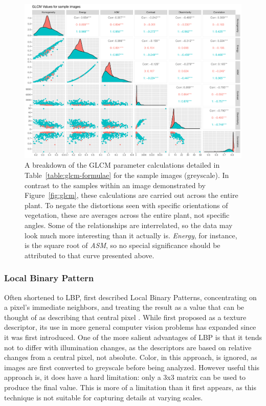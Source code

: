 \documentclass[letterpaper]{report}
\begin{document}
\begin{figure}[H]
	\centering
	\includegraphics[width=0.9\linewidth]{./figures/glcm-pairs.pdf}
	\caption[GLCM parameter correlation assessment]{A breakdown of the GLCM parameter calculations detailed in Table~\ref{table:glcm-formulae} for the sample images (greyscale). In contrast to the samples within an image demonstrated by Figure~\ref{fig:glcm}, these calculations are carried out across the entire plant. To negate the distortions seen with specific orientations of vegetation, these are averages across the entire plant, not specific angles. Some of the relationships are interrelated, so the data may look much more interesting than it actually is. \textit{Energy}, for instance, is the square root of \textit{ASM}, so no special significance should be attributed to that curve presented above.}
\end{figure} 

\subsubsection{Local Binary Pattern}
Often shortened to LBP, \citeauthor{Ojala1996-ps} first described Local Binary Patterns, concentrating on a pixel's immediate neighbors, and treating the result as a value that can be thought of as describing that central pixel \parencite{Ojala1996-ps}. While first proposed as a texture descriptor, its use in more general computer vision problems has expanded since it was first introduced. One of the more salient advantages of LBP is that it tends not to differ with illumination changes, as the descriptors are based on relative changes from a central pixel, not absolute. Color, in this approach, is ignored, as images are first converted to greyscale before being analyzed. However useful this approach is, it does have a hard limitation: only a 3x3 matrix can be used to produce the final value. This is more of a limitation than it first appears, as this technique is not suitable for capturing details at varying scales.
\end{document}
